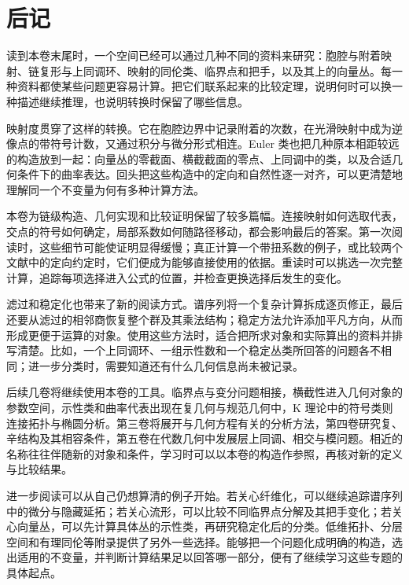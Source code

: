 \chapter*{后记}
读到本卷末尾时，一个空间已经可以通过几种不同的资料来研究：胞腔与附着映射、链复形与上同调环、映射的同伦类、临界点和把手，以及其上的向量丛。每一种资料都使某些问题更容易计算。把它们联系起来的比较定理，说明何时可以换一种描述继续推理，也说明转换时保留了哪些信息。

\ProseParagraphBreak

映射度贯穿了这样的转换。它在胞腔边界中记录附着的次数，在光滑映射中成为逆像点的带符号计数，又通过积分与微分形式相连。Euler 类也把几种原本相距较远的构造放到一起：向量丛的零截面、横截截面的零点、上同调中的类，以及合适几何条件下的曲率表达。回头把这些构造中的定向和自然性逐一对齐，可以更清楚地理解同一个不变量为何有多种计算方法。

\ProseParagraphBreak

本卷为链级构造、几何实现和比较证明保留了较多篇幅。连接映射如何选取代表，交点的符号如何确定，局部系数如何随路径移动，都会影响最后的答案。第一次阅读时，这些细节可能使证明显得缓慢；真正计算一个带扭系数的例子，或比较两个文献中的定向约定时，它们便成为能够直接使用的依据。重读时可以挑选一次完整计算，追踪每项选择进入公式的位置，并检查更换选择后发生的变化。

\ProseParagraphBreak

滤过和稳定化也带来了新的阅读方式。谱序列将一个复杂计算拆成逐页修正，最后还要从滤过的相邻商恢复整个群及其乘法结构；稳定方法允许添加平凡方向，从而形成更便于运算的对象。使用这些方法时，适合把所求对象和实际算出的资料并排写清楚。比如，一个上同调环、一组示性数和一个稳定丛类所回答的问题各不相同；进一步分类时，需要知道还有什么几何信息尚未被记录。

\ProseParagraphBreak

后续几卷将继续使用本卷的工具。临界点与变分问题相接，横截性进入几何对象的参数空间，示性类和曲率代表出现在复几何与规范几何中，K 理论中的符号类则连接拓扑与椭圆分析。第三卷将展开与几何方程有关的分析方法，第四卷研究复、辛结构及其相容条件，第五卷在代数几何中发展层上同调、相交与模问题。相近的名称往往伴随新的对象和条件，学习时可以以本卷的构造作参照，再核对新的定义与比较结果。

\ProseParagraphBreak

进一步阅读可以从自己仍想算清的例子开始。若关心纤维化，可以继续追踪谱序列中的微分与隐藏延拓；若关心流形，可以比较不同临界点分解及其把手变化；若关心向量丛，可以先计算具体丛的示性类，再研究稳定化后的分类。低维拓扑、分层空间和有理同伦等附录提供了另外一些选择。能够把一个问题化成明确的构造，选出适用的不变量，并判断计算结果足以回答哪一部分，便有了继续学习这些专题的具体起点。
